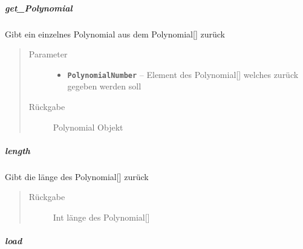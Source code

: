 \documentclass[letterpaper,10pt,ngerman]{sphinxmanual}
\begin{document}
\subparagraph{get\_Polynomial}
\label{com/linuxluigi/polynomial/PolynomialList:get-polynomial}

\begin{fulllineitems}
\label{com/linuxluigi/polynomial/PolynomialList:com.linuxluigi.polynomial.PolynomialList.get_Polynomial(int)}
Gibt ein einzelnes Polynomial aus dem Polynomial{[}{]} zurück
\begin{quote}\begin{description}
\item[{Parameter}] \leavevmode\begin{itemize}
\item {} 
\textbf{\texttt{PolynomialNumber}} -- Element des Polynomial{[}{]} welches zurück gegeben werden soll

\end{itemize}

\item[{Rückgabe}] \leavevmode
Polynomial Objekt

\end{description}\end{quote}

\end{fulllineitems}



\subparagraph{length}
\label{com/linuxluigi/polynomial/PolynomialList:length}

\begin{fulllineitems}
\label{com/linuxluigi/polynomial/PolynomialList:com.linuxluigi.polynomial.PolynomialList.length()}
Gibt die länge des Polynomial{[}{]} zurück
\begin{quote}\begin{description}
\item[{Rückgabe}] \leavevmode
Int länge des Polynomial{[}{]}

\end{description}\end{quote}

\end{fulllineitems}



\subparagraph{load}
\label{com/linuxluigi/polynomial/PolynomialList:load}
\end{document}
